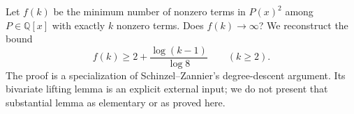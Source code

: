 Let $f(k)$ be the minimum number of nonzero terms in $P(x)^2$ among $P\in\mathbb Q[x]$ with exactly $k$ nonzero terms. Does $f(k)\to\infty$? We reconstruct the bound
\[f(k)\ge2+\frac{\log(k-1)}{\log8}\qquad(k\ge2).\tag{1}\]
The proof is a specialization of Schinzel--Zannier's degree-descent argument. Its bivariate lifting lemma is an explicit external input; we do not present that substantial lemma as elementary or as proved here.
